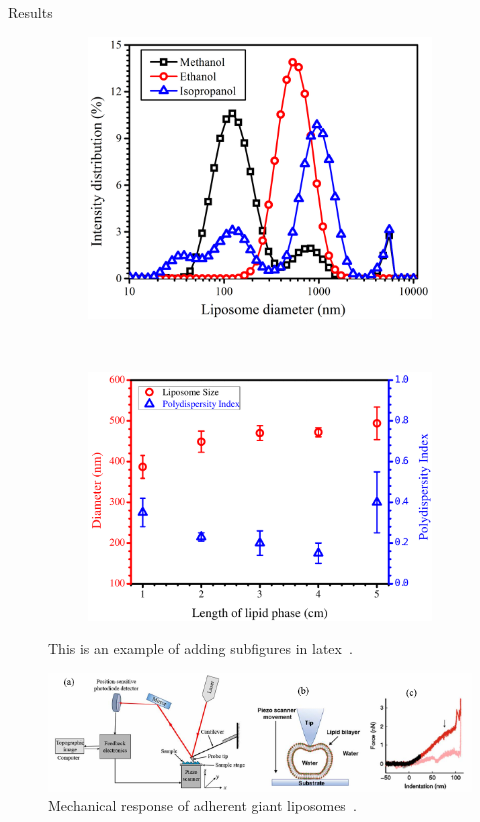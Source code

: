 \documentclass[20pt]{beamer}
\begin{document}
\begin{frame}[t]
\begin{columns}[t]
\begin{column}{0.32\linewidth}
\begin{block}{Results}
\begin{figure}
	\begin{subfigure}[b]{0.45\linewidth}
		\centering		 
		\includegraphics[width=0.9\linewidth]{res2}
		\caption{}	
	\end{subfigure} 
	~
	\begin{subfigure}[b]{0.45\linewidth}	
		\includegraphics[width=\linewidth]{res3}
		\caption{}	    
	\end{subfigure} 
	\caption{This is an example of adding subfigures in latex~\cite{has2018rapid}.}
\end{figure} 

\vspace{1cm}

\begin{figure}
	\includegraphics[width=0.65\linewidth]{res4}
	\caption{Mechanical response of adherent giant liposomes~\cite{sorkin2018nanomechanics}.}
\end{figure}


\end{block}
\end{column}
\end{columns}
\end{frame}
\end{document}
